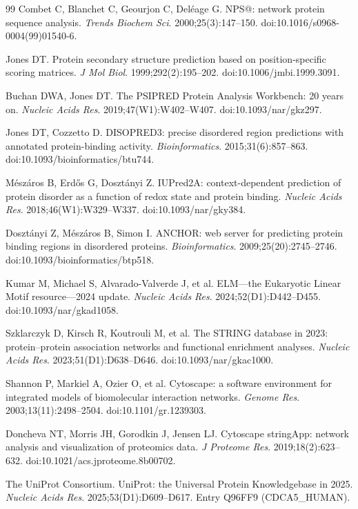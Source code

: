 \documentclass[11pt]{article}
\begin{document}
\begin{thebibliography}{99}
 Combet C, Blanchet C, Geourjon C, Del\'{e}age G. NPS@: network protein sequence analysis. \textit{Trends Biochem Sci}. 2000;25(3):147--150. doi:10.1016/s0968-0004(99)01540-6.

 Jones DT. Protein secondary structure prediction based on position-specific scoring matrices. \textit{J Mol Biol}. 1999;292(2):195--202. doi:10.1006/jmbi.1999.3091.

 Buchan DWA, Jones DT. The PSIPRED Protein Analysis Workbench: 20 years on. \textit{Nucleic Acids Res}. 2019;47(W1):W402--W407. doi:10.1093/nar/gkz297.

 Jones DT, Cozzetto D. DISOPRED3: precise disordered region predictions with annotated protein-binding activity. \textit{Bioinformatics}. 2015;31(6):857--863. doi:10.1093/bioinformatics/btu744.

 M\'esz\'aros B, Erd\H{o}s G, Doszt\'anyi Z. IUPred2A: context-dependent prediction of protein disorder as a function of redox state and protein binding. \textit{Nucleic Acids Res}. 2018;46(W1):W329--W337. doi:10.1093/nar/gky384.

 Doszt\'anyi Z, M\'esz\'aros B, Simon I. ANCHOR: web server for predicting protein binding regions in disordered proteins. \textit{Bioinformatics}. 2009;25(20):2745--2746. doi:10.1093/bioinformatics/btp518.

 Kumar M, Michael S, Alvarado-Valverde J, et al. ELM---the Eukaryotic Linear Motif resource---2024 update. \textit{Nucleic Acids Res}. 2024;52(D1):D442--D455. doi:10.1093/nar/gkad1058.

 Szklarczyk D, Kirsch R, Koutrouli M, et al. The STRING database in 2023: protein--protein association networks and functional enrichment analyses. \textit{Nucleic Acids Res}. 2023;51(D1):D638--D646. doi:10.1093/nar/gkac1000.

 Shannon P, Markiel A, Ozier O, et al. Cytoscape: a software environment for integrated models of biomolecular interaction networks. \textit{Genome Res}. 2003;13(11):2498--2504. doi:10.1101/gr.1239303.

 Doncheva NT, Morris JH, Gorodkin J, Jensen LJ. Cytoscape stringApp: network analysis and visualization of proteomics data. \textit{J Proteome Res}. 2019;18(2):623--632. doi:10.1021/acs.jproteome.8b00702.

 The UniProt Consortium. UniProt: the Universal Protein Knowledgebase in 2025. \textit{Nucleic Acids Res}. 2025;53(D1):D609--D617. Entry Q96FF9 (CDCA5\_HUMAN).

\end{thebibliography}
\end{document}
